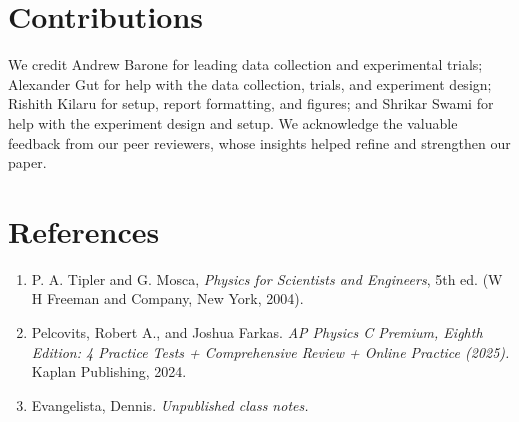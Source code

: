 \documentclass[aps, prl, twocolumn, 10pt]{revtex4-2}
\begin{document}
        \section{Contributions}
        \hrulefill
        
        We credit Andrew Barone for leading data collection and experimental trials; Alexander Gut for help with the data collection, trials, and experiment design; Rishith Kilaru for setup, report formatting, and figures; and Shrikar Swami for help with the experiment design and setup. We acknowledge the valuable feedback from our peer reviewers, whose insights helped refine and strengthen our paper.
    
    \vspace{6.5em}
    \section*{References}
        
        \begin{enumerate}
            \item P. A. Tipler and G. Mosca, \textit{Physics for Scientists and Engineers}, 5th ed. (W H Freeman and Company, New York, 2004).
            \item Pelcovits, Robert A., and Joshua Farkas. \textit{AP Physics C Premium, Eighth Edition: 4 Practice Tests + Comprehensive Review + Online Practice (2025).} Kaplan Publishing, 2024. 
            \item Evangelista, Dennis. \textit {Unpublished class notes.}
        
        \end{enumerate}
\end{document}
